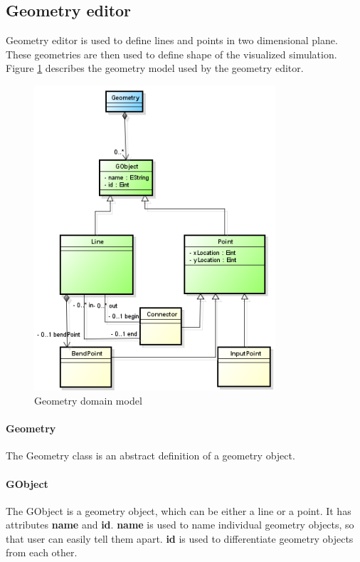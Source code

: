 \subsection{Geometry editor}
Geometry editor is used to define lines and points in two dimensional plane. These geometries are then used to define shape of the visualized simulation. Figure \ref{fig:model-geometry} describes the geometry model used by the geometry editor.

\begin{figure}[htp]
\begin{center}
  \includegraphics[width=0.8\textwidth]{image/model-geometry.png}
  \caption{Geometry domain model}
  \label{fig:model-geometry}
\end{center}
\end{figure}

\paragraph{Geometry}
The Geometry class is an abstract definition of a geometry object.

\paragraph{GObject}
The GObject is a geometry object, which can be either a line or a point. It has attributes \textbf{name} and \textbf{id}. \textbf{name} is used to name individual geometry objects, so that user can easily tell them apart. \textbf{id} is used to differentiate geometry objects from each other.


